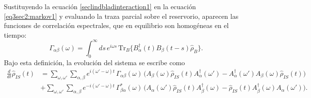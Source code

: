 Sustituyendo la ecuación \eqref{seclindbladinteraction1} en la ecuación \eqref{eq3sec2:markov1} y evaluando la traza parcial sobre el reservorio, aparecen las funciones de correlación espectrales, que en equilibrio son homogéneas en el tiempo:
\begin{equation*}
    \Gamma_{\alpha\beta}(\omega) = \int_{0}^{\infty} ds \, e^{i\omega s}\, 
    \text{Tr}_{B}\{B_{\alpha}^{\dagger}(t)B_{\beta}(t-s)\hat{\rho}_{B}\}.
\end{equation*}
Bajo esta definición, la evolución del sistema se escribe como
\begin{align*}
    \frac{d}{dt}\hat{\rho}_{IS}(t) &=
    \sum_{\omega,\omega'}\sum_{\alpha,\beta} e^{i(\omega'-\omega)t}\, \Gamma_{\alpha\beta}(\omega)\,
    \Big(A_{\beta}(\omega)\hat{\rho}_{IS}(t)A_{\alpha}^{\dagger}(\omega')
        - A_{\alpha}^{\dagger}(\omega')A_{\beta}(\omega)\hat{\rho}_{IS}(t)\Big) \\
    &+ \sum_{\omega,\omega'}\sum_{\alpha,\beta} e^{-i(\omega'-\omega)t}\, \Gamma^{*}_{\beta\alpha}(\omega)\,
    \Big(A_{\alpha}(\omega')\hat{\rho}_{IS}(t)A_{\beta}^{\dagger}(\omega)
        - \hat{\rho}_{IS}(t)A_{\beta}^{\dagger}(\omega)A_{\alpha}(\omega')\Big).
\end{align*}

